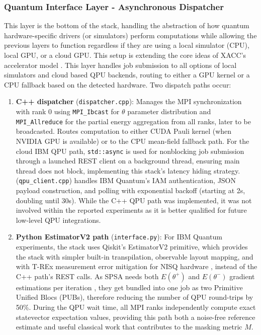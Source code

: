 \subsubsection{Quantum Interface Layer - Asynchronous Dispatcher}
This layer is the bottom of the stack, handling the abstraction of how quantum hardware-specific drivers 
(or simulators) perform computations while allowing the previous layers to function regardless if they 
are using a local simulator (CPU), local GPU, or a cloud GPU. This setup is extending the core ideas of XACC's accelerator model \parencite{mccaskey2018xacc}.   
This layer handles job submission to all options of local simulators and cloud based QPU backends, 
routing to either a GPU kernel or a CPU fallback based on the detected hardware. Two dispatch paths occur:
\begin{enumerate}
    \item \textbf{C++ dispatcher} (\texttt{dispatcher.cpp}): Manages the MPI synchronization with rank 0 using \texttt{MPI\_Ibcast} for $\theta$  parameter distribution and \texttt{MPI\_Allreduce} for the partial energy aggregation from all ranks, later to be broadcasted. Routes computation to either CUDA Pauli kernel (when NVIDIA GPU is available) or to the CPU mean-field fallback path. For the cloud IBM QPU path, \texttt{std::async} is used for nonblocking job submission through a launched REST client on a background thread, ensuring main thread does not block, implementing this stack's latency hiding strategy. (\texttt{qpu\_client.cpp}) handles IBM Quantum's IAM authentication, JSON payload construction, and polling with exponential backoff (starting at 2s, doubling until 30s). While the C++ QPU path was implemented, it was not involved within the reported experiments as it is better qualified for future low-level QPU integrations. 
    \item \textbf{Python EstimatorV2 path} (\texttt{interface.py}): For IBM Quantum experiments, the stack uses Qiskit's EstimatorV2 primitive, which provides the stack with simpler built-in transpilation, observable layout mapping, and with T-REx measurement error mitigation for NISQ hardware \parencite{cai2023quantumerrormitigation}, instead of the C++ path's REST calls. As SPSA needs both $E(\theta^+)$ and $E(\theta^-)$ gradient estimations per iteration \parencite{pellow2021classicoptimizers}, they get bundled into one job as two Primitive Unified Blocs (PUBs), therefore reducing the number of QPU round-trips by 50\%. During the QPU wait time, all MPI ranks independently compute exact statevector expectation values, providing this path both a noise-free reference estimate and useful classical work that contributes to the masking metric $M$.
\end{enumerate}

